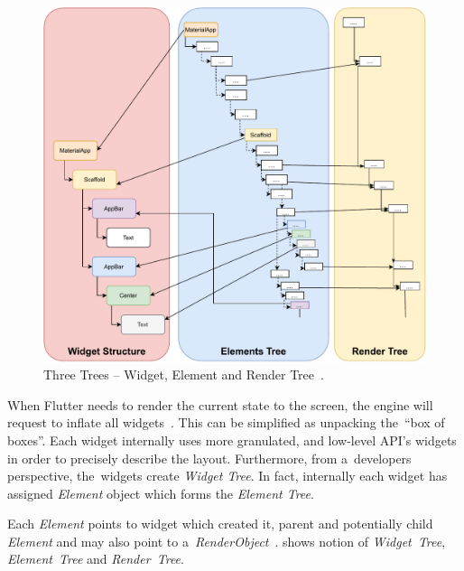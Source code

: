 \begin{figure}[ht]
    \centering
    \includegraphics[width=\linewidth]{img/flutter/internals_3_trees.pdf}
    \caption{Three Trees -- Widget, Element and Render Tree~\cite{didier-internals}.}
    \label{fig:flutter-internal-3-trees}
\end{figure}

When Flutter needs to render the current state to the screen, the engine will request to inflate all widgets~\cite{didier-internals}. This can be simplified as unpacking the~``box of boxes''. Each widget internally uses more granulated, and low-level API's widgets in order to precisely describe the layout. Furthermore, from a~developers perspective, the~widgets create \textit{Widget Tree}. In fact, internally each widget has assigned \textit{Element} object which forms the \textit{Element Tree}.

Each \textit{Element} points to widget which created it, parent and potentially child \textit{Element} and may also point to a~\textit{RenderObject}~\cite{didier-internals}.   shows notion of \textit{Widget~Tree}, \textit{Element~Tree} and \textit{Render~Tree}.

